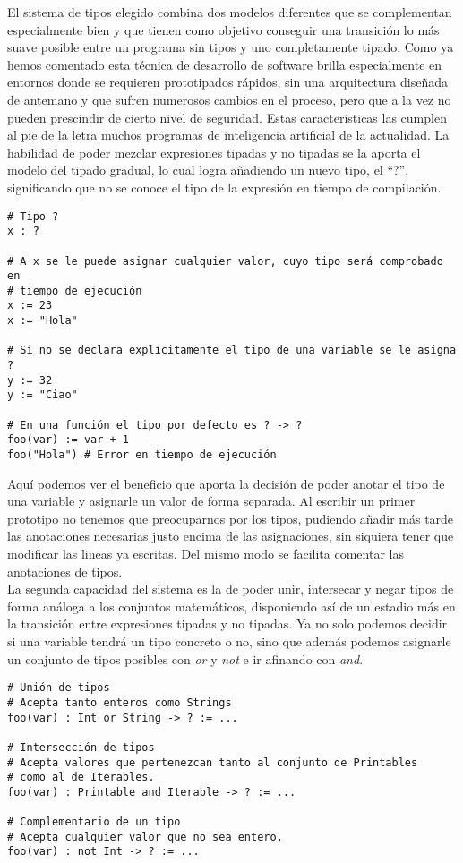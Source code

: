 El sistema de tipos elegido combina dos modelos diferentes que se complementan especialmente bien y que tienen como objetivo conseguir una transición lo más suave posible entre un programa sin tipos y uno completamente tipado. Como ya hemos comentado esta técnica de desarrollo de software brilla especialmente en entornos donde se requieren prototipados rápidos, sin una arquitectura diseñada de antemano y que sufren numerosos cambios en el proceso, pero que a la vez no pueden prescindir de cierto nivel de seguridad. Estas características las cumplen al pie de la letra muchos programas de inteligencia artificial de la actualidad. La habilidad de poder mezclar expresiones tipadas y no tipadas se la aporta el modelo del tipado gradual, lo cual logra añadiendo un nuevo tipo, el ``?'', significando que no se conoce el tipo de la expresión en tiempo de compilación.

\begin{lstlisting}[style=tail, caption={Tipos graduales}]
# Tipo ?
x : ?

# A x se le puede asignar cualquier valor, cuyo tipo será comprobado en
# tiempo de ejecución
x := 23
x := "Hola"

# Si no se declara explícitamente el tipo de una variable se le asigna ?
y := 32
y := "Ciao"

# En una función el tipo por defecto es ? -> ?
foo(var) := var + 1
foo("Hola") # Error en tiempo de ejecución
\end{lstlisting}

Aquí podemos ver el beneficio que aporta la decisión de poder anotar el tipo de una variable y asignarle un valor de forma separada. Al escribir un primer prototipo no tenemos que preocuparnos por los tipos, pudiendo añadir más tarde las anotaciones necesarias justo encima de las asignaciones, sin siquiera tener que modificar las lineas ya escritas. Del mismo modo se facilita comentar las anotaciones de tipos.\\

La segunda capacidad del sistema es la de poder unir, intersecar y negar tipos de forma análoga a los conjuntos matemáticos, disponiendo así de un estadio más en la transición entre expresiones tipadas y no tipadas. Ya no solo podemos decidir si una variable tendrá un tipo concreto o no, sino que además podemos asignarle un conjunto de tipos posibles con \textit{or} y \textit{not} e ir afinando con \textit{and}.

\begin{lstlisting}[style=tail, caption={Unión e intersección de tipos}]
# Unión de tipos
# Acepta tanto enteros como Strings
foo(var) : Int or String -> ? := ...

# Intersección de tipos
# Acepta valores que pertenezcan tanto al conjunto de Printables
# como al de Iterables.
foo(var) : Printable and Iterable -> ? := ...

# Complementario de un tipo
# Acepta cualquier valor que no sea entero.
foo(var) : not Int -> ? := ...
\end{lstlisting}

